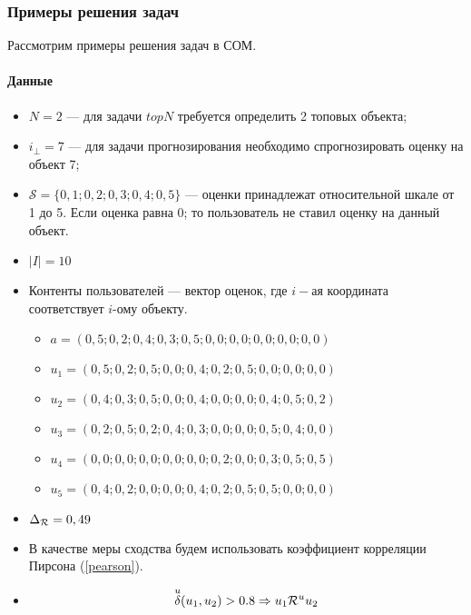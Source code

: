 
\subsubsection{Примеры решения задач}
Рассмотрим примеры решения задач в СОМ.
\paragraph{Данные}
\begin{itemize}
\item $N=2$ --- для задачи $topN$ требуется определить 2 топовых объекта;
\item $i_{\bot} = 7$ --- для задачи прогнозирования необходимо спрогнозировать оценку на объект 7;
\item $\mathcal{S} = \{0,1;0,2;0,3;0,4;0,5\}$ --- оценки принадлежат относительной шкале от 1 до 5. Если оценка равна 0; то пользователь не
ставил оценку на данный объект.
\item $|I| = 10$
\item Контенты пользователей --- вектор оценок, где $i-ая$ координата соответствует $i$-ому объекту.
  \begin{itemize}
    \item $a =   (0,5; 0,2; 0,4; 0,3; 0,5; 0,0; 0,0; 0,0; 0,0; 0,0)$
    \item $u_1 = (0,5; 0,2; 0,5; 0,0; 0,4; 0,2; 0,5; 0,0; 0,0; 0,0)$
    \item $u_2 = (0,4; 0,3; 0,5; 0,0; 0,4; 0,0; 0,0; 0,4; 0,5; 0,2)$
    \item $u_3 = (0,2; 0,5; 0,2; 0,4; 0,3; 0,0; 0,0; 0,5; 0,4; 0,0)$
    \item $u_4 = (0,0; 0,0; 0,0; 0,0; 0,0; 0,2; 0,0; 0,3; 0,5; 0,5)$
    \item $u_5 = (0,4; 0,2; 0,0; 0,0; 0,4; 0,2; 0,5; 0,5; 0,0; 0,0)$
  \end{itemize}
\item $\Delta_{\mathcal{R}} = 0,49$
\item В качестве меры сходства будем использовать коэффициент корреляции
	Пирсона (\ref{pearson}).
\item
  \begin{equation}
    {\overset{u}{\mathcal{\delta}}}(u_1,u_2) > 0.8 \Rightarrow u_1 \mathcal{R}^u u_2
  \end{equation}
\end{itemize}
